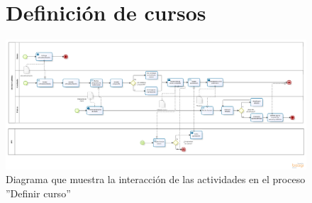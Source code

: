 \begin{landscape}
  \begin{figure}[b]
  \section{Definición de cursos} 
	\hspace{4cm}
  \begin{center}
      \includegraphics[width=22cm]{images/DefinirCurso}
       \caption{Diagrama que muestra la  interacción de las actividades en el proceso ''Definir curso''}
  \end{center}
 \end{figure}
\end{landscape}





